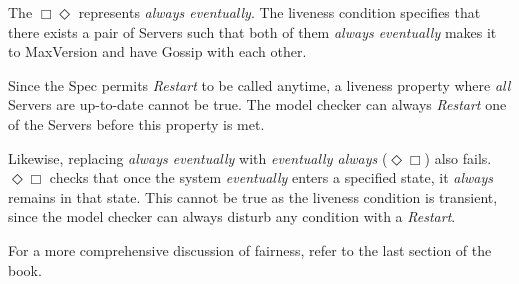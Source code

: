 The $\Box\Diamond$ represents \textit{always eventually}. The liveness condition
specifies that there exists a pair of Servers such that both of them
\textit{always eventually} makes it to MaxVersion and have Gossip with each
other.\newline

Since the Spec permits \textit{Restart} to be called anytime, a liveness
property where \textit{all} Servers are up-to-date cannot be true. The model
checker can always \textit{Restart} one of the Servers before this property is
met.\newline

Likewise, replacing \textit{always eventually} with \textit{eventually always}
($\Diamond\Box$) also fails. $\Diamond\Box$ checks that once the system
\textit{eventually} enters a specified state, it \textit{always} remains in that
state. This cannot be true as the liveness condition is transient, since the
model checker can always disturb any condition with a \textit{Restart}.\newline

For a more comprehensive discussion of fairness, refer to the last section of
the book.

% 
